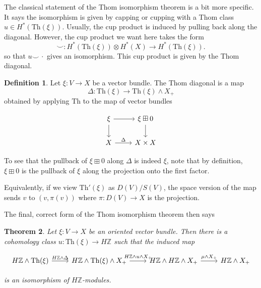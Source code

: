 \documentclass{shortart}
\newtheorem{thm}{Theorem}[section]
\theoremstyle{definition}
\newtheorem{defi}[thm]{Definition}
\newcommand\Th{\mathrm{Th}}
\newcommand\Z{\mathbb{Z}}
\begin{document}
The classical statement of the Thom isomorphism theorem is a bit more specific. It says the isomorphism is given by capping or cupping with a Thom class $u \in H^*(\Th(\xi))$. Usually, the cup product is induced by pulling back along the diagonal. However, the cup product we want here takes the form
\[
  \smile: H^*(\Th(\xi)) \otimes H^*(X) \to H^*(\Th(\xi)).
\]
so that $u \smile\,\cdot$ gives an isomorphism. This cup product is given by the Thom diagonal.

\begin{defi}
  Let $\xi: V \to X$ be a vector bundle. The Thom diagonal is a map 
  \[
    \Delta: \Th(\xi) \to \Th(\xi) \wedge X_+
  \]
  obtained by applying $\Th$ to the map of vector bundles
  \begin{useimager}
    \[
      \begin{tikzcd}
        \xi \ar[d] \ar[r] & \xi \boxplus 0 \ar[d]\\
        X \ar[r, "\Delta"] & X \times X
      \end{tikzcd}
    \]
  \end{useimager}
  To see that the pullback of $\xi \boxplus 0$ along $\Delta$ is indeed $\xi$, note that by definition, $\xi \boxplus 0$ is the pullback of $\xi$ along the projection onto the first factor.

  Equivalently, if we view $\Th'(\xi)$ as $D(V) / S(V)$, the space version of the map sends $v$ to $(v, \pi(v))$ where $\pi: D(V) \to X$ is the projection.
\end{defi}

The final, correct form of the Thom isomorphism theorem then says
\begin{thm}
  Let $\xi: V \to X$ be an oriented vector bundle. Then there is a cohomology class $u: \Th(\xi) \to H\Z$ such that the induced map
  \begin{useimager}
    \[
      \begin{tikzcd}
        H\Z \wedge \Th(\xi) \ar[r, "H\Z \wedge \Delta"] & H\Z \wedge \Th(\xi) \wedge X_+ \ar[r, "H\Z \wedge u \wedge X_+"] & H\Z \wedge H\Z \wedge X_+ \ar[r, "\mu \wedge X_+"] & H\Z \wedge X_+
      \end{tikzcd}
    \]
  \end{useimager}
  is an isomorphism of $H\Z$-modules.
\end{thm}
\end{document}
